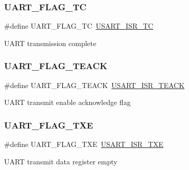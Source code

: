 \subsubsection{\texorpdfstring{UART\_FLAG\_TC}{UART\_FLAG\_TC}}
{\footnotesize\ttfamily \#define U\+A\+R\+T\+\_\+\+F\+L\+A\+G\+\_\+\+TC~\mbox{\hyperlink{group___peripheral___registers___bits___definition_gaa41e8667b30453a6b966aded9f5e8cbb}{U\+S\+A\+R\+T\+\_\+\+I\+S\+R\+\_\+\+TC}}}

U\+A\+RT transmission complete \mbox{\label{group___u_a_r_t___flags_gaf4a4ade6fd987ea7f22786269317f94a}} 
\subsubsection{\texorpdfstring{UART\_FLAG\_TEACK}{UART\_FLAG\_TEACK}}
{\footnotesize\ttfamily \#define U\+A\+R\+T\+\_\+\+F\+L\+A\+G\+\_\+\+T\+E\+A\+CK~\mbox{\hyperlink{group___peripheral___registers___bits___definition_gaf1433ae77d20ec6da645117cde536f81}{U\+S\+A\+R\+T\+\_\+\+I\+S\+R\+\_\+\+T\+E\+A\+CK}}}

U\+A\+RT transmit enable acknowledge flag \mbox{\label{group___u_a_r_t___flags_gad39c017d415a7774c82eb07413a9dbe4}} 
\subsubsection{\texorpdfstring{UART\_FLAG\_TXE}{UART\_FLAG\_TXE}}
{\footnotesize\ttfamily \#define U\+A\+R\+T\+\_\+\+F\+L\+A\+G\+\_\+\+T\+XE~\mbox{\hyperlink{group___peripheral___registers___bits___definition_gab59be9f02a6e304a82da3e298c6a72ab}{U\+S\+A\+R\+T\+\_\+\+I\+S\+R\+\_\+\+T\+XE}}}

U\+A\+RT transmit data register empty 